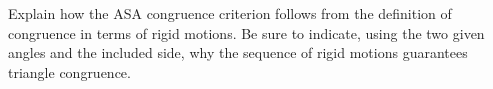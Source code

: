 \begin{prob}
Explain how the ASA congruence criterion follows from the definition of congruence in terms of rigid motions. Be sure to indicate, using the two given angles and the included side, why the sequence of rigid motions guarantees triangle congruence.
\end{prob}

%


